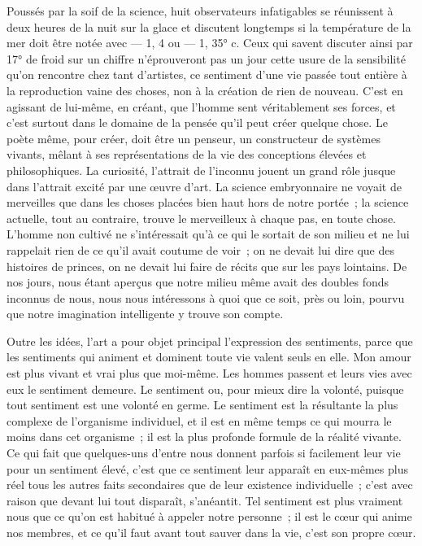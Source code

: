 \documentclass[french,twoside]{book} %
\begin{document}
Poussés par la soif de la science, huit observateurs infatigables se réunissent à deux heures de la nuit sur la glace et discutent longtemps si la température de la mer doit être notée avec — 1, 4 ou — 1, 35° c. Ceux qui savent discuter ainsi par 17° de froid sur un chiffre n’éprouveront pas un jour cette usure de la sensibilité qu’on rencontre chez tant d’artistes, ce sentiment d’une vie passée tout entière à la reproduction vaine des choses, non à la création de rien de nouveau. C’est en agissant de lui-même, en créant, que l’homme sent véritablement ses forces, et c’est surtout dans le domaine de la pensée qu’il peut créer quelque chose. Le poète même, pour créer, doit être un penseur, un constructeur de systèmes vivants, mêlant à ses représentations de la vie des conceptions élevées et philosophiques. La curiosité, l’attrait de l’inconnu jouent un grand rôle jusque dans l’attrait excité par une œuvre d’art. La science embryonnaire ne voyait de merveilles que dans les choses placées bien haut hors de notre portée ; la science actuelle, tout au contraire, trouve le merveilleux à chaque pas, en toute chose. L’homme non cultivé ne s’intéressait qu’à ce qui le sortait de son milieu et ne lui rappelait rien de ce qu’il avait coutume de voir ; on ne devait lui dire que des histoires de princes, on ne devait lui faire de récits que sur les pays lointains. De nos jours, nous étant aperçus que notre milieu même avait des doubles fonds inconnus de nous, nous nous intéressons à quoi que ce soit, près ou loin, pourvu que notre imagination intelligente y trouve son compte.\par
Outre les idées, l’art a pour objet principal l’expression des sentiments, parce que les sentiments qui animent et dominent toute vie valent seuls en elle. Mon amour est plus vivant et vrai plus que moi-même. Les hommes passent et leurs vies avec eux le sentiment demeure. Le sentiment ou, pour mieux dire la volonté, puisque tout sentiment est une volonté en germe. Le sentiment est la résultante la plus complexe de l’organisme individuel, et il est en même temps ce qui mourra le moins dans cet organisme ; il est la plus profonde formule de la réalité vivante. Ce qui fait que quelques-uns d’entre nous donnent parfois si facilement leur vie pour un sentiment élevé, c’est que ce sentiment leur apparaît en eux-mêmes plus réel tous les autres faits secondaires que de leur existence individuelle ; c’est avec raison que devant lui tout disparaît, s’anéantit. Tel sentiment est plus vraiment nous que ce qu’on est habitué à appeler notre personne ; il est le cœur qui anime nos membres, et ce qu’il faut avant tout sauver dans la vie, c’est son propre cœur.\par
\end{document}
